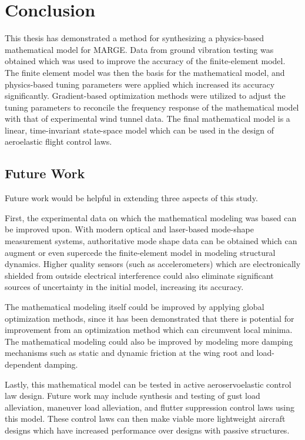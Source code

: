 \chapter{Conclusion}
\label{ch:conclusion}

This thesis has demonstrated a method for synthesizing a physics-based mathematical model for MARGE. Data from ground vibration testing was obtained which was used to improve the accuracy of the finite-element model. The finite element model was then the basis for the mathematical model, and physics-based tuning parameters were applied which increased its accuracy significantly. Gradient-based optimization methods were utilized to adjust the tuning parameters to reconcile the frequency response of the mathematical model with that of experimental wind tunnel data. The final mathematical model is a linear, time-invariant state-space model which can be used in the design of aeroelastic flight control laws.

\section{Future Work}

Future work would be helpful in extending three aspects of this study.

First, the experimental data on which the mathematical modeling was based can be improved upon. With modern optical and laser-based mode-shape measurement systems, authoritative mode shape data can be obtained which can augment or even supercede the finite-element model in modeling structural dynamics. Higher quality sensors (such as accelerometers) which are electronically shielded from outside electrical interference could also eliminate significant sources of uncertainty in the initial model, increasing its accuracy.

The mathematical modeling itself could be improved by applying global optimization methods, since it has been demonstrated that there is potential for improvement from an optimization method which can circumvent local minima. The mathematical modeling could also be improved by modeling more damping mechanisms such as static and dynamic friction at the wing root and load-dependent damping.

Lastly, this mathematical model can be tested in active aeroservoelastic control law design. Future work may include synthesis and testing of gust load alleviation, maneuver load alleviation, and flutter suppression control laws using this model. These control laws can then make viable more lightweight aircraft designs which have increased performance over designs with passive structures.